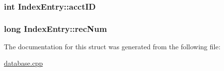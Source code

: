 \subsubsection[{\texorpdfstring{acct\+ID}{acctID}}]{\setlength{\rightskip}{0pt plus 5cm}int Index\+Entry\+::acct\+ID}\hypertarget{struct_index_entry_aa5008695f70f365c7959d42ccca0fa13}{}\label{struct_index_entry_aa5008695f70f365c7959d42ccca0fa13}
\subsubsection[{\texorpdfstring{rec\+Num}{recNum}}]{\setlength{\rightskip}{0pt plus 5cm}long Index\+Entry\+::rec\+Num}\hypertarget{struct_index_entry_a3f71077b699f2d718ca60df893c4c470}{}\label{struct_index_entry_a3f71077b699f2d718ca60df893c4c470}


The documentation for this struct was generated from the following file\+:\begin{DoxyCompactItemize}
\item 
\hyperlink{database_8cpp}{database.\+cpp}\end{DoxyCompactItemize}
